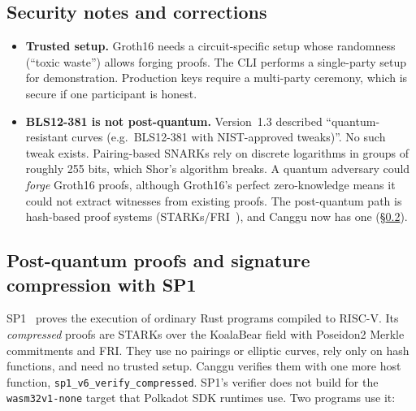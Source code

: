 \documentclass[11pt]{article}
\theoremstyle{definition}
\theoremstyle{remark}
\begin{document}
\subsection{Security notes and corrections}
\begin{itemize}[leftmargin=*]
  \item \textbf{Trusted setup.} Groth16 needs a circuit-specific setup whose randomness (``toxic
        waste'') allows forging proofs. The CLI performs a single-party setup for demonstration.
        Production keys require a multi-party ceremony, which is secure if one participant is honest.
  \item \textbf{BLS12-381 is not post-quantum.} Version~1.3 described ``quantum-resistant curves
        (e.g.\ BLS12-381 with NIST-approved tweaks)''. No such tweak exists. Pairing-based SNARKs rely
        on discrete logarithms in groups of roughly 255 bits, which Shor's algorithm breaks. A
        quantum adversary could \emph{forge} Groth16 proofs, although Groth16's perfect
        zero-knowledge means it could not extract witnesses from existing proofs. The post-quantum
        path is hash-based proof systems (STARKs/FRI~\cite{starks}), and Canggu now has one
        (\S\ref{sec:sp1}).
\end{itemize}

\subsection{Post-quantum proofs and signature compression with SP1}
\label{sec:sp1}

SP1~\cite{sp1} proves the execution of ordinary Rust programs compiled to RISC-V. Its
\emph{compressed} proofs are STARKs over the KoalaBear field with Poseidon2 Merkle commitments and
FRI. They use no pairings or elliptic curves, rely only on hash functions, and need no trusted
setup. Canggu verifies them with one more host function, \texttt{sp1\_v6\_verify\_compressed}.
SP1's verifier does not build for the \texttt{wasm32v1-none} target that Polkadot SDK runtimes
use. Two programs use it:
\end{document}
